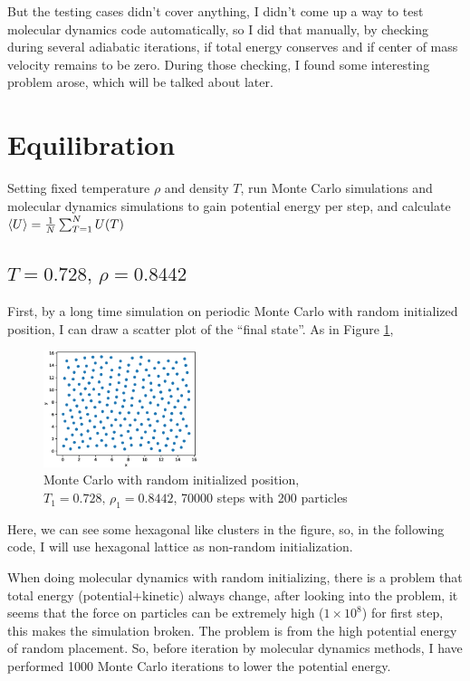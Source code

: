 \documentclass[UTF8,a4paper]{article}
\begin{document}
But the testing cases didn't cover anything, I didn't come up a way to test molecular dynamics code automatically, so I did that manually, by checking during several adiabatic iterations, if total energy conserves and if center of mass velocity remains to be zero. During
those checking, I found some interesting problem arose, which will be talked about later.

\section{Equilibration}
Setting fixed temperature $\rho$ and density $T$, run Monte Carlo simulations and molecular dynamics simulations to gain potential energy per step, and calculate
$\expval{U} = \frac{1}{N}\sum_{T=1}^N U(T)$
\subsection{$T =0.728,\, \rho = 0.8442$}

First, by a long time simulation on periodic Monte Carlo with random initialized position, I can draw a scatter plot of the ``final state''. As in Figure \ref{fig:scatter},
\begin{figure}[h]
	\centering
	\includegraphics[width=0.4\textwidth]{fig/rand_scatter_70000_steps_200_particles_0.8442_rho_0.728_tempure_.eps}
	\caption{Monte Carlo with random initialized position, $T_1 =0.728,\, \rho_1 = 0.8442$, 70000 steps with 200 particles}
	\label{fig:scatter}
\end{figure}

Here, we can see some hexagonal like clusters in the figure, so, in the following code, I will use hexagonal lattice as non-random initialization.

When doing molecular dynamics with random initializing, there is a problem that total energy (potential+kinetic) always change, after looking into the problem, it seems that the force on
particles can be extremely high ($1\times 10^{8}$) for first step, this makes the simulation broken. The problem is from the high potential energy of random placement. So, before iteration by
molecular dynamics methods, I have performed 1000 Monte Carlo iterations to lower the potential energy.
\end{document}
